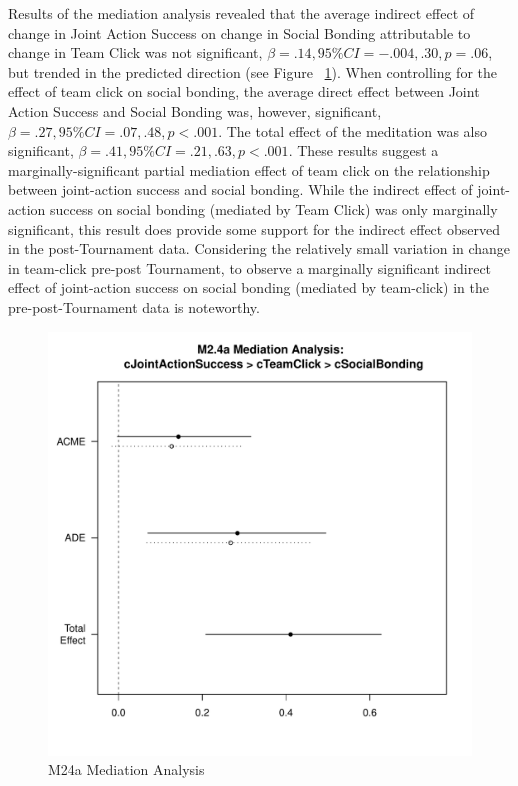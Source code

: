 \begin{landscape}
  Results of the mediation analysis revealed that the average indirect effect of change in Joint Action Success on change in Social Bonding attributable to change in Team Click was not significant, $\beta = .14, 95\% CI = -.004 , .30, p = .06$, but trended in the predicted direction (see Figure ~\ref{fig:MLM24aMediationAnalysis}).  When controlling for the effect of team click on social bonding, the average direct effect between Joint Action Success and Social Bonding was, however, significant, $\beta = .27, 95\% CI = .07 , .48, p < .001$.  The total effect of the meditation was also significant, $\beta = .41, 95\% CI = .21 , .63, p < .001$.  These results suggest a marginally-significant partial mediation effect of team click on the relationship between joint-action success and social bonding.  While the indirect effect of joint-action success on social bonding (mediated by Team Click) was only marginally significant, this result does provide some support for the indirect effect observed in the post-Tournament data.  Considering the relatively small variation in change in team-click pre-post Tournament, to observe a marginally significant indirect effect of joint-action success on social bonding (mediated by team-click) in the pre-post-Tournament data is noteworthy.




\begin{figure}[htbp]
  \centering
  \includegraphics[width=\columnwidth]{images/MLM24aMediationAnalysis.pdf}
  \caption{M24a Mediation Analysis}
  \label{fig:MLM24aMediationAnalysis}
\end{figure}




\end{landscape}
